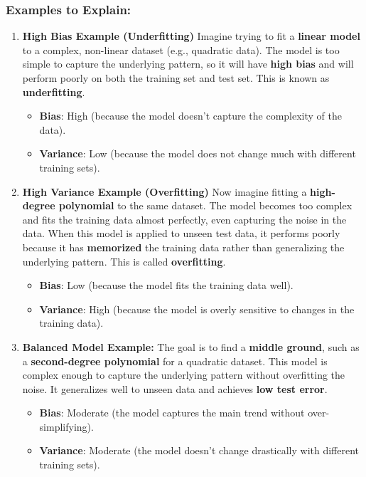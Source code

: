 \documentclass[12pt]{book}
\begin{document}
\subsubsection*{Examples to Explain:}
\begin{enumerate}
    \item \textbf{High Bias Example (Underfitting)} Imagine trying to fit a \textbf{linear model} to a complex, non-linear dataset (e.g., quadratic data). The model is too simple to capture the underlying pattern, so it will have \textbf{high bias} and will perform poorly on both the training set and test set. This is known as \textbf{underfitting}.
    \begin{itemize}
        \item [-] \textbf{Bias}: High (because the model doesn't capture the complexity of the data).
        \item [-] \textbf{Variance}: Low (because the model does not change much with different training sets).
    \end{itemize}
    \item \textbf{High Variance Example (Overfitting)} Now imagine fitting a \textbf{high-degree polynomial} to the same dataset. The model becomes too complex and fits the training data almost perfectly, even capturing the noise in the data. When this model is applied to unseen test data, it performs poorly because it has \textbf{memorized} the training data rather than generalizing the underlying pattern. This is called \textbf{overfitting}.
    \begin{itemize}
        \item [-] \textbf{Bias}: Low (because the model fits the training data well).
        \item [-] \textbf{Variance}: High (because the model is overly sensitive to changes in the training data).
    \end{itemize}
    \item \textbf{Balanced Model Example:} The goal is to find a \textbf{middle ground}, such as a \textbf{second-degree polynomial} for a quadratic dataset. This model is complex enough to capture the underlying pattern without overfitting the noise. It generalizes well to unseen data and achieves \textbf{low test error}.
    \begin{itemize}
        \item [-] \textbf{Bias}: Moderate (the model captures the main trend without over-simplifying).
        \item [-] \textbf{Variance}: Moderate (the model doesn't change drastically with different training sets).
    \end{itemize}
\end{enumerate}
\end{document}

